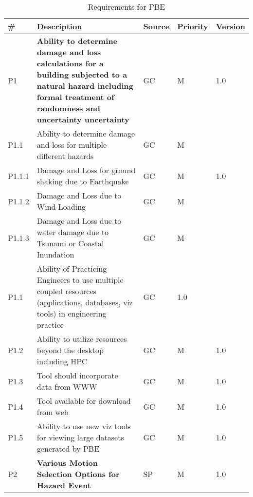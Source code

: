 \begin{longtable}{| p{} | p{} | p{} | p{} |  p{} |}

\caption{Requirements for PBE}
  \label{tab:featureRequirements}   
    \\
   \hline
\rowcolor{lightgray}
      \# & Description & Source & Priority & Version \\ \hline
      
      P1 & \textbf{Ability to determine damage and loss calculations for a building subjected to a natural hazard including formal treatment of randomness and uncertainty uncertainty} & GC & M  & 1.0  \\ \hline
      P1.1 & Ability to determine  damage and loss for multiple different hazards & GC & M &  \\ \hline
      P1.1.1 & Damage and Loss for ground shaking due to Earthquake & GC & M & 1.0 \\ \hline
      P1.1.2 & Damage and Loss due to Wind Loading & GC & M &  \\ \hline
      P1.1.3 & Damage and Loss due to water damage due to Tsunami or Coastal Inundation & GC & M &  \\ \hline
     P1.1 & Ability of Practicing Engineers to use multiple coupled resources (applications, databases, viz tools) in engineering practice & GC & 1.0 \\ \hline
P1.2 & Ability to utilize resources beyond the desktop including HPC & GC & M & 1.0 \\ \hline
P1.3 & Tool should incorporate data from WWW & GC & M & 1.0 \\ \hline
P1.4 & Tool available for download from web & GC & M & 1.0 \\ \hline
P1.5 & Ability to use new viz tools for viewing large datasets generated by PBE & GC & M & 1.0 \\ \hhline{=====}
P2 & \textbf{Various Motion Selection Options for Hazard Event} & SP & M & 1.0  \\ \hline


\end{longtable}
